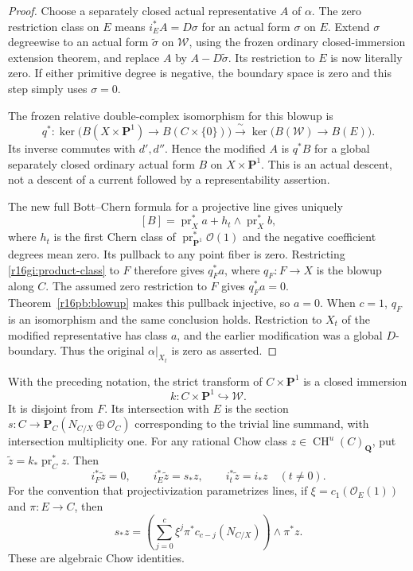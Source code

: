 \begin{proof}
Choose a separately closed actual representative $A$ of $\alpha$.
The zero restriction class on $E$ means $i_E^*A=D\sigma$ for an
actual form $\sigma$ on $E$.  Extend $\sigma$ degreewise to an
actual form $\widetilde\sigma$ on $\mathcal W$, using the frozen
ordinary closed-immersion extension theorem, and replace $A$ by
$A-D\widetilde\sigma$.  Its restriction to $E$ is now literally
zero.  If either primitive degree is negative, the boundary space is
zero and this step simply uses $\sigma=0$.

The frozen relative double-complex isomorphism for this blowup is
\[
 q^*:\ker\bigl(B(X\times\mathbf P^1)\to B(C\times\{0\})\bigr)
       \xrightarrow{\ \sim\ }
       \ker\bigl(B(\mathcal W)\to B(E)\bigr).
 \tag{GI16.1}\label{r16gi:relative}
\]
Its inverse commutes with $d',d''$.  Hence the modified $A$ is
$q^*B$ for a global separately closed ordinary actual form $B$ on
$X\times\mathbf P^1$.  This is an actual descent, not a descent
of a current followed by a representability assertion.

The new full Bott--Chern formula for a projective line gives uniquely
\[
 [B]=\operatorname{pr}_X^*a+
       h_t\wedge\operatorname{pr}_X^*b,
 \tag{GI16.2}\label{r16gi:product-class}
\]
where $h_t$ is the first Chern class of
$\operatorname{pr}_{\mathbf P^1}^*\mathcal O(1)$ and the negative
coefficient degrees mean zero.  Its pullback to any point fiber
is zero.  Restricting \eqref{r16gi:product-class} to $F$ therefore
gives $q_F^*a$, where $q_F:F\to X$ is the blowup along $C$.
The assumed zero restriction to $F$ gives $q_F^*a=0$.
Theorem~\ref{r16pb:blowup} makes this pullback injective, so $a=0$.
When $c=1$, $q_F$ is an isomorphism and the same conclusion holds.
Restriction to $X_t$ of the modified representative has class $a$,
and the earlier modification was a global $D$-boundary.  Thus the
original $\alpha|_{X_t}$ is zero as asserted.
\end{proof}

\begin{lemma}
\label{r16gi:geometry}
With the preceding notation, the strict transform of
$C\times\mathbf P^1$ is a closed immersion
\[
 k:C\times\mathbf P^1\hookrightarrow\mathcal W.
\]
It is disjoint from $F$.  Its intersection with $E$ is the section
$s:C\to\mathbf P_C(N_{C/X}\oplus\mathcal O_C)$ corresponding
to the trivial line summand, with intersection multiplicity one.
For any rational Chow class $z\in\operatorname{CH}^u(C)_{\mathbf Q}$,
put $\widetilde z=k_*\operatorname{pr}_C^*z$.  Then
\[
 i_F^*\widetilde z=0,\qquad
 i_E^*\widetilde z=s_*z,
 \qquad i_t^*\widetilde z=i_*z\quad(t\ne0).
 \tag{GI16.3}\label{r16gi:restrictions}
\]
For the convention that projectivization parametrizes lines, if
$\xi=c_1(\mathcal O_E(1))$ and $\pi:E\to C$, then
\[
 s_*z=
   \left(\sum_{j=0}^{c}\xi^j\pi^*c_{c-j}(N_{C/X})\right)
                                 \wedge\pi^*z.
 \tag{GI16.4}\label{r16gi:section-class}
\]
These are algebraic Chow identities.
\end{lemma}

